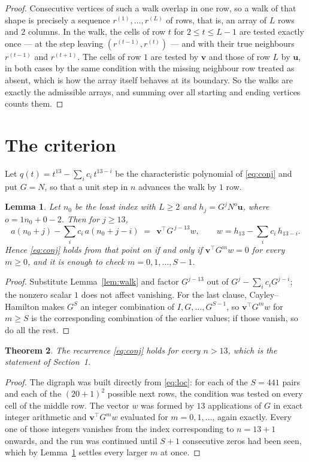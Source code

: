 \documentclass[11pt,a4paper]{article}
\theoremstyle{plain}
\newtheorem{theorem}{Theorem}
\newtheorem{lemma}[theorem]{Lemma}
\theoremstyle{definition}
\begin{document}
\begin{proof}
Consecutive vertices of such a walk overlap in one row, so a walk of that shape is
precisely a sequence $r^{(1)},\dots,r^{(L)}$ of rows, that is, an array of $L$ rows
and $2$ columns. In the walk, the cells of row $t$ for $2\le t\le L-1$ are tested
exactly once --- at the step leaving $(r^{(t-1)},r^{(t)})$ --- and with their true
neighbours $r^{(t-1)}$ and $r^{(t+1)}$. The cells of row $1$ are tested by
$\mathbf{v}$ and those of row $L$ by $\mathbf{u}$, in both cases by the same condition
with the missing neighbour row treated as absent, which is how the array itself behaves at
its boundary. So the walks are exactly the admissible arrays, and summing over all starting
and ending vertices counts them.
\end{proof}

\section{The criterion}

Let $q(t)=t^{13}-\sum_i c_i\,t^{13-i}$ be the characteristic polynomial of
\eqref{eq:conj} and put $G=N$, so that a unit step in $n$ advances the walk by
$1$ row.

\begin{lemma}\label{lem:crit}
Let $n_0$ be the least index with $L\ge2$ and $h_j=G^{j}N^{o}\mathbf{u}$, where
$o=1n_0+0-2$. Then for $j\ge13$,
\[
a(n_0+j)-\sum_i c_i\,a(n_0+j-i)\;=\;\,\mathbf{v}^{\!\top}G^{\,j-13}w,
\qquad w=h_{13}-\sum_i c_i\,h_{13-i} .
\]
Hence \eqref{eq:conj} holds from that point on if and only if
$\mathbf{v}^{\!\top}G^{m}w=0$ for every $m\ge0$, and it is enough to check
$m=0,1,\dots,S-1$.
\end{lemma}

\begin{proof}
Substitute Lemma~\ref{lem:walk} and factor $G^{j-13}$ out of
$G^{j}-\sum_ic_iG^{j-i}$; the nonzero scalar $1$ does not affect
vanishing. For the last clause, Cayley--Hamilton makes $G^{S}$ an integer combination of
$I,G,\dots,G^{S-1}$, so $\mathbf{v}^{\!\top}G^{m}w$ for $m\ge S$ is the corresponding
combination of the earlier values; if those vanish, so do all the rest.
\end{proof}

\begin{theorem}
The recurrence \eqref{eq:conj} holds for every $n>13$, which is the statement of
Section~1.
\end{theorem}

\begin{proof}
The digraph was built directly from \eqref{eq:loc}: for each of the $S=441$ pairs and each
of the $(20+1)^{2}$ possible next rows, the condition was tested on every cell of
the middle row. The vector $w$ was formed by $13$ applications of $G$ in exact integer
arithmetic and $\mathbf{v}^{\!\top}G^{m}w$ evaluated for $m=0,1,\dots$, again exactly.
Every one of those integers vanishes from the index corresponding to $n=13+1$ onwards,
and the run was continued until $S+1$ consecutive zeros had been seen, which by
Lemma~\ref{lem:crit} settles every larger $m$ at once.
\end{proof}
\end{document}
